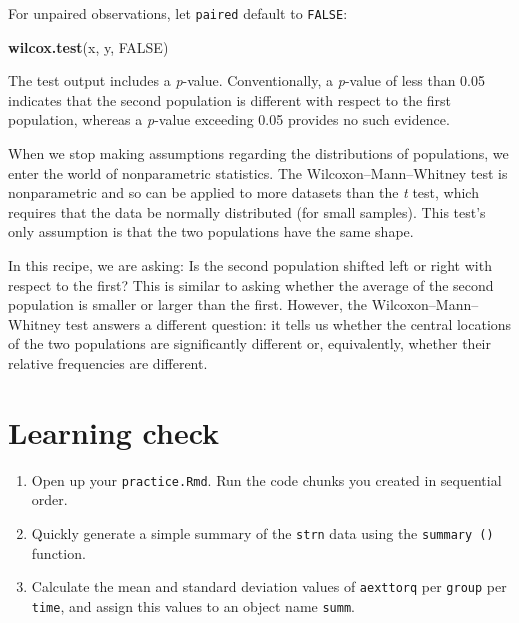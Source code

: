 \documentclass[
]{book}
\newenvironment{Shaded}{\begin{snugshade}}{\end{snugshade}}
\newcommand{\KeywordTok}[1]{\textcolor[rgb]{0.13,0.29,0.53}{\textbf{#1}}}
\newcommand{\NormalTok}[1]{#1}
\newcommand{\OtherTok}[1]{\textcolor[rgb]{0.56,0.35,0.01}{#1}}
\begin{document}
For unpaired observations, let \texttt{paired} default to \texttt{FALSE}:

\begin{Shaded}
\begin{Highlighting}[]
\KeywordTok{wilcox.test}\NormalTok{(x, y, }\OtherTok{FALSE}\NormalTok{)}
\end{Highlighting}
\end{Shaded}

The test output includes a \emph{p}-value. Conventionally, a \emph{p}-value of
less than 0.05 indicates that the second population is different with respect to the first population, whereas a \emph{p}-value exceeding 0.05 provides no such evidence.

When we stop making assumptions regarding the distributions of
populations, we enter the world of nonparametric statistics. The
Wilcoxon--Mann--Whitney test is nonparametric and so can be applied to
more datasets than the \emph{t} test, which requires that the data be
normally distributed (for small samples). This test's only assumption is
that the two populations have the same shape.

In this recipe, we are asking: Is the second population shifted left or
right with respect to the first? This is similar to asking whether the
average of the second population is smaller or larger than the first.
However, the Wilcoxon--Mann--Whitney test answers a different question: it
tells us whether the central locations of the two populations are
significantly different or, equivalently, whether their relative
frequencies are different.

\hypertarget{learning-check}{%
\section*{Learning check}\label{learning-check}}

\begin{enumerate}
\def\labelenumi{\arabic{enumi}.}
\item
  Open up your \texttt{practice.Rmd}. Run the code chunks you created in sequential order.
\item
  Quickly generate a simple summary of the \texttt{strn} data using the \texttt{summary\ ()} function.
\item
  Calculate the mean and standard deviation values of \texttt{aexttorq} per \texttt{group} per \texttt{time}, and assign this values to an object name \texttt{summ}.
\end{enumerate}
\end{document}
